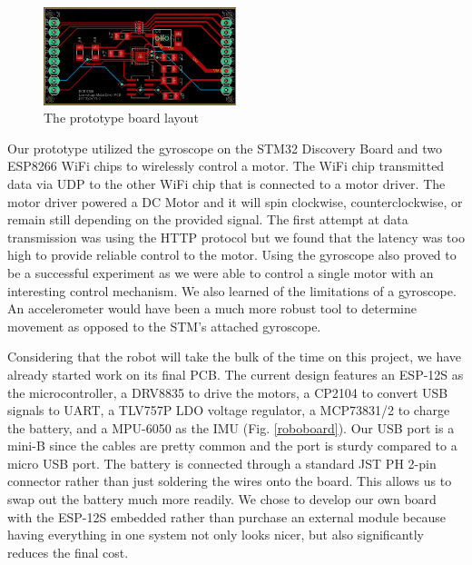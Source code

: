 \documentclass[11pt]{ieeeconf}
\begin{document}
\begin{figure}[H]
\centering
\captionsetup{justification=centering}
\includegraphics[width=0.5\textwidth]{images/prototype.png}
\caption{The prototype board layout}
\label{prototype}
\end{figure}

Our prototype utilized the gyroscope on the STM32 Discovery Board and two ESP8266 WiFi chips to wirelessly control a motor. The WiFi chip transmitted data via UDP to the other WiFi chip that is connected to a motor driver. The motor driver powered a DC Motor and it will spin clockwise, counterclockwise, or remain still depending on the provided signal. The first attempt at data transmission was using the HTTP protocol but we found that the latency was too high to provide reliable control to the motor. Using the gyroscope also proved to be a successful experiment as we were able to control a single motor with an interesting control mechanism. We also learned of the limitations of a gyroscope. An accelerometer would have been a much more robust tool to determine movement as opposed to the STM's attached gyroscope.  

Considering that the robot will take the bulk of the time on this project, we have already started work on its final PCB. The current design features an ESP-12S as the microcontroller, a DRV8835 to drive the motors, a CP2104 to convert USB signals to UART, a TLV757P LDO voltage regulator, a MCP73831/2 to charge the battery, and a MPU-6050 as the IMU (Fig. \ref{roboboard}). Our USB port is a mini-B since the cables are pretty common and the port is sturdy compared to a micro USB port. The battery is connected through a standard JST PH 2-pin connector rather than just soldering the wires onto the board. This allows us to swap out the battery much more readily. We chose to develop our own board with the ESP-12S embedded rather than purchase an external module because having everything in one system not only looks nicer, but also significantly reduces the final cost.
\end{document}
